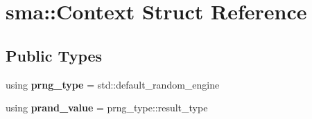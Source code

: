 \hypertarget{structsma_1_1Context}{\section{sma\-:\-:Context Struct Reference}
\label{structsma_1_1Context}
}
\subsection*{Public Types}
\begin{DoxyCompactItemize}
\item 
\hypertarget{structsma_1_1Context_a0c156eea49d45224ed9704af320bbfff}{using {\bfseries prng\-\_\-type} = std\-::default\-\_\-random\-\_\-engine}\label{structsma_1_1Context_a0c156eea49d45224ed9704af320bbfff}

\item 
\hypertarget{structsma_1_1Context_ac00b1641d9bce206710bbd4014768489}{using {\bfseries prand\-\_\-value} = prng\-\_\-type\-::result\-\_\-type}\label{structsma_1_1Context_ac00b1641d9bce206710bbd4014768489}

\end{DoxyCompactItemize}
